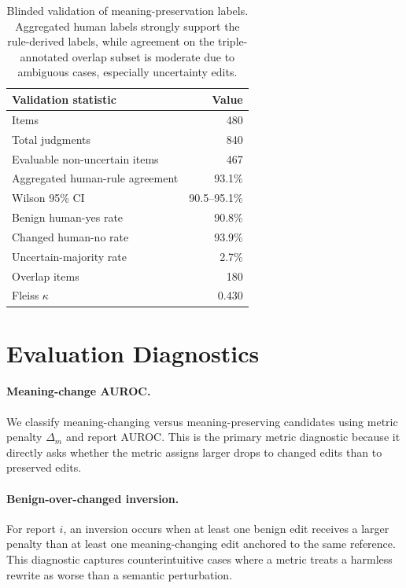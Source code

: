 \documentclass[11pt]{article}
\newcommand{\pres}{meaning-preserving\xspace}
\newcommand{\chg}{meaning-changing\xspace}
\begin{document}
\begin{table}[t]
\centering
\small
\begin{tabular}{lr}
\toprule
\textbf{Validation statistic} & \textbf{Value} \\
\midrule
Items & 480 \\
Total judgments & 840 \\
Evaluable non-uncertain items & 467 \\
Aggregated human-rule agreement & 93.1\% \\
Wilson 95\% CI & 90.5--95.1\% \\
Benign human-yes rate & 90.8\% \\
Changed human-no rate & 93.9\% \\
Uncertain-majority rate & 2.7\% \\
Overlap items & 180 \\
Fleiss $\kappa$ & 0.430 \\
\bottomrule
\end{tabular}
\caption{Blinded validation of meaning-preservation labels. Aggregated human labels strongly support the rule-derived labels, while agreement on the triple-annotated overlap subset is moderate due to ambiguous cases, especially uncertainty edits.}
\label{tab:human-validation}
\end{table}


\section{Evaluation Diagnostics}
\label{sec:diagnostics}

\paragraph{Meaning-change AUROC.}
We classify \chg versus \pres candidates using metric penalty $\Delta_m$ and report AUROC. This is the primary metric diagnostic because it directly asks whether the metric assigns larger drops to changed edits than to preserved edits.

\paragraph{Benign-over-changed inversion.}
For report $i$, an inversion occurs when at least one benign edit receives a larger penalty than at least one meaning-changing edit anchored to the same reference. This diagnostic captures counterintuitive cases where a metric treats a harmless rewrite as worse than a semantic perturbation.
\end{document}
